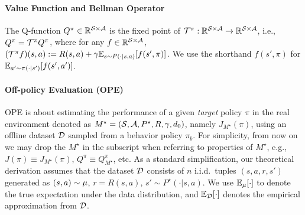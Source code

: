 \paragraph{Value Function and Bellman Operator} The Q-function $Q^\pi\in \mathbb{R}^{\mathcal{S}\times\mathcal{A}}$ is the fixed point of $\mathcal{T}^\pi: \mathbb{R}^{\mathcal{S}\times\mathcal{A}} \to \mathbb{R}^{\mathcal{S}\times\mathcal{A}}$, i.e., $Q^\pi = \mathcal{T}^\pi Q^\pi$, where for any $f\in \mathbb{R}^{\mathcal{S}\times\mathcal{A}}$, $(\mathcal{T}^\pi f)(s,a):= R(s,a) + \gamma \mathbb{E}_{s\sim P(\cdot|s,a)}[f(s',\pi)]$. We use the shorthand $f(s',\pi)$ for $\mathbb{E}_{a'\sim \pi(\cdot|s')}[f(s',a')]$. 

\paragraph{Off-policy Evaluation (OPE)} OPE is about estimating the performance of a given \textit{target} policy $\pi$ in the real environment denoted as $M^\star = (\mathcal{S}, \mathcal{A}, P^\star, R, \gamma, d_0)$, namely $J_{M^\star}(\pi)$, using an offline dataset $\mathcal{D}$ sampled from a behavior policy $\pi_b$. %
For simplicity, from now on we may drop the $M^\star$ in the subscript when referring to properties of $M^\star$, e.g., $J(\pi)\equiv J_{M^\star}(\pi)$, $Q^\pi \equiv Q_{M^\star}^\pi$, etc. 
%
As a standard simplification, our theoretical derivation assumes that the dataset $\mathcal{D}$ consists of $n$ i.i.d.~tuples $(s,a,r,s')$ generated as $(s,a) \sim \mu$, $r = R(s,a)$, $s' \sim P^\star(\cdot|s,a)$. We use $\mathbb{E}_{\mu}[\cdot]$ to denote the true expectation under the data distribution, and $\mathbb{E}_{\mathcal{D}}[\cdot]$ denotes the empirical approximation from $\mathcal{D}$. 

